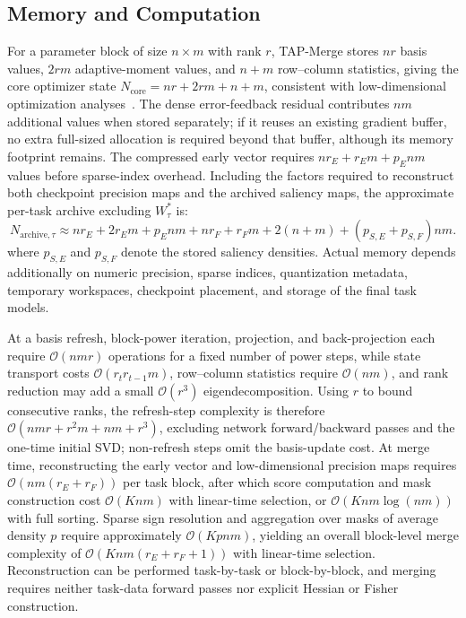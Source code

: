 \documentclass[fleqn,10pt]{wlscirep}
\begin{document}
\subsection{Memory and Computation}
\label{subsec:memory_complexity}

For a parameter block of size $n\times m$ with rank $r$, TAP-Merge stores $nr$ basis values, $2rm$ adaptive-moment values, and $n+m$ row--column statistics, giving the core optimizer state $N_{\mathrm{core}}=nr+2rm+n+m$, consistent with low-dimensional optimization analyses~\cite{galore2024,rgp2024,qgalore2025,ldadam2025}. The dense error-feedback residual contributes $nm$ additional values when stored separately; if it reuses an existing gradient buffer, no extra full-sized allocation is required beyond that buffer, although its memory footprint remains. The compressed early vector requires $nr_E+r_Em+p_Enm$ values before sparse-index overhead. Including the factors required to reconstruct both checkpoint precision maps and the archived saliency maps, the approximate per-task archive excluding $W_{\tau}^{*}$ is:
\begin{equation}
N_{\mathrm{archive},\tau}\approx nr_E+2r_Em+p_Enm+nr_F+r_Fm+2(n+m)+(p_{S,E}+p_{S,F})nm.
\label{eq:archive_memory}
\end{equation}
where $p_{S,E}$ and $p_{S,F}$ denote the stored saliency densities. Actual memory depends additionally on numeric precision, sparse indices, quantization metadata, temporary workspaces, checkpoint placement, and storage of the final task models.

At a basis refresh, block-power iteration, projection, and back-projection each require $\mathcal{O}(nmr)$ operations for a fixed number of power steps, while state transport costs $\mathcal{O}(r_tr_{t-1}m)$, row--column statistics require $\mathcal{O}(nm)$, and rank reduction may add a small $\mathcal{O}(r^3)$ eigendecomposition. Using $r$ to bound consecutive ranks, the refresh-step complexity is therefore $\mathcal{O}(nmr+r^2m+nm+r^3)$, excluding network forward/backward passes and the one-time initial SVD; non-refresh steps omit the basis-update cost. At merge time, reconstructing the early vector and low-dimensional precision maps requires $\mathcal{O}(nm(r_E+r_F))$ per task block, after which score computation and mask construction cost $\mathcal{O}(Knm)$ with linear-time selection, or $\mathcal{O}(Knm\log(nm))$ with full sorting. Sparse sign resolution and aggregation over masks of average density $p$ require approximately $\mathcal{O}(Kpnm)$, yielding an overall block-level merge complexity of $\mathcal{O}(Knm(r_E+r_F+1))$ with linear-time selection. Reconstruction can be performed task-by-task or block-by-block, and merging requires neither task-data forward passes nor explicit Hessian or Fisher construction.
\end{document}
